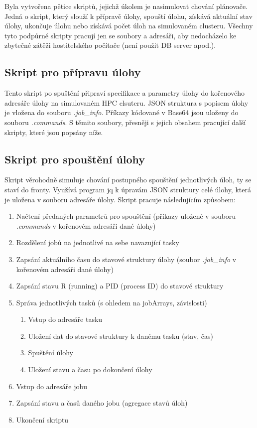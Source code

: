 \hfill \break


Byla vytvořena pětice skriptů, jejichž úkolem je nasimulovat chování plánovače. Jedná o skript, který slouží k přípravě úlohy, spouští úlohu, získává aktuální stav úlohy, ukončuje úlohu nebo získává počet úloh na simulovaném clusteru. Všechny tyto podpůrné skripty pracují jen se soubory a adresáři, aby nedocházelo ke zbytečné zátěži hostitelského počítače (není použit DB server apod.). 

\subsection{Skript pro přípravu úlohy}
Tento skript po spuštění připraví specifikace a parametry úlohy do kořenového adresáře úlohy na simulovaném HPC clsuteru. JSON struktura s popisem úlohy je vložena do souboru \emph{.job\_info}. Příkazy kódované v Base64 jsou uloženy do souboru \emph{.commands}. S těmito soubory, přesněji s jejich obsahem pracující další skripty, které jsou popsány níže.


\subsection{Skript pro spouštění úlohy}
Skript věrohodně simuluje chování postupného spouštění jednotlivých úloh, ty se staví do fronty. Využívá program jq k úpravám JSON struktury celé úlohy, která je uložena v souboru adresáře úlohy. Skript pracuje následujícím způsobem:

\begin{enumerate}
	\item Načtení předaných parametrů pro spouštění (příkazy uložené v souboru \emph{.commands} v kořenovém adresáři dané úlohy)
	\item Rozdělení jobů na jednotlivé na sebe navazující tasky
	\item Zapsání aktuálního času do stavové struktury úlohy (soubor \emph{.job\_info} v kořenovém adresáři dané úlohy)
	\item Zapsání stavu R (running) a PID (process ID) do stavové struktury
	\item Správa jednotlivých tasků (s ohledem na jobArrays, závislosti)
	\begin{enumerate}
		\item Vstup do adresáře tasku
		\item Uložení dat do stavové struktury k danému tasku (stav, čas)
		\item Spuštění úlohy
		\item Uložení stavu a času po dokončení úlohy
	\end{enumerate}
	\item Vstup do adresáře jobu
	\item Zapsání stavu a časů daného jobu (agregace stavů úloh)
	\item Ukončení skriptu
\end{enumerate}


